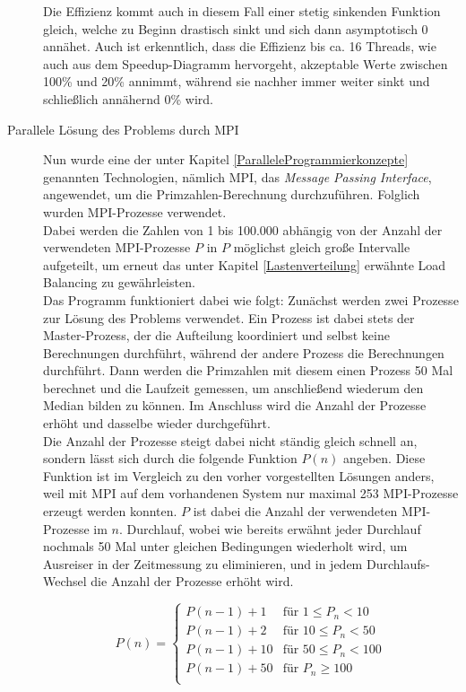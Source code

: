 \begin{description}
						Die Effizienz kommt auch in diesem Fall einer stetig sinkenden Funktion gleich, welche zu Beginn drastisch sinkt und sich dann asymptotisch 0 annähet. Auch ist erkenntlich, dass die Effizienz bis ca. 16 Threads, wie auch aus dem Speedup-Diagramm hervorgeht, akzeptable Werte zwischen 100\% und 20\% annimmt, während sie nachher immer weiter sinkt und schließlich annähernd 0\% wird.

					\item[Parallele Lösung des Problems durch MPI]
					
						Nun wurde eine der unter Kapitel \ref{ParalleleProgrammierkonzepte} genannten Technologien, nämlich MPI, das \textit{Message Passing Interface}, angewendet, um die Primzahlen-Berechnung durchzuführen. Folglich wurden MPI-Prozesse verwendet.\\
						Dabei werden die Zahlen von 1 bis 100.000 abhängig von der Anzahl der verwendeten MPI-Prozesse $P$ in $P$ möglichst gleich große Intervalle aufgeteilt, um erneut das unter Kapitel \ref{Lastenverteilung} erwähnte Load Balancing zu gewährleisten.\\
						Das Programm funktioniert dabei wie folgt: Zunächst werden zwei Prozesse zur Lösung des Problems verwendet. Ein Prozess ist dabei stets der Master-Prozess, der die Aufteilung koordiniert und selbst keine Berechnungen durchführt, während der andere Prozess die Berechnungen durchführt. Dann werden die Primzahlen mit diesem einen Prozess 50 Mal berechnet und die Laufzeit gemessen, um anschließend wiederum den Median bilden zu können. Im Anschluss wird die Anzahl der Prozesse erhöht und dasselbe wieder durchgeführt.\\
						Die Anzahl der Prozesse steigt dabei nicht ständig gleich schnell an, sondern lässt sich durch die folgende Funktion $P(n)$ angeben. Diese Funktion ist im Vergleich zu den vorher vorgestellten Lösungen anders, weil mit MPI auf dem vorhandenen System nur maximal 253 MPI-Prozesse erzeugt werden konnten. $P$ ist dabei die Anzahl der verwendeten MPI-Prozesse im $n$. Durchlauf, wobei wie bereits erwähnt jeder Durchlauf nochmals 50 Mal unter gleichen Bedingungen wiederholt wird, um Ausreiser in der Zeitmessung zu eliminieren, und in jedem Durchlaufs-Wechsel die Anzahl der Prozesse erhöht wird.
						
						\begin{equation}
							P(n) =
							\begin{cases}
								P(n - 1) + 1 & \text{für } 1 \leq P_n < 10\\
								P(n - 1) + 2 & \text{für } 10 \leq P_n < 50\\
								P(n - 1) + 10 & \text{für } 50 \leq P_n < 100\\
								P(n - 1) + 50 & \text{für } P_n \geq 100\\
							\end{cases}
						\end{equation}
						

\end{description}
